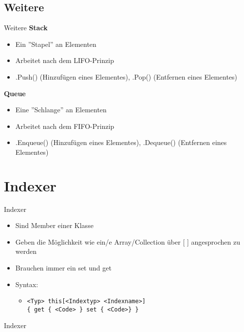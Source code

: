 \subsection{Weitere}
\begin{frame}{Weitere}
	\textbf{Stack}\\
	\begin{itemize}
		\item Ein ''Stapel'' an Elementen
		\item Arbeitet nach dem LIFO-Prinzip
		\item \alert{.Push()} (Hinzufügen eines Elementes), \alert{.Pop()} (Entfernen eines Elementes)
	\end{itemize}
	
	\textbf{Queue}\\
	\begin{itemize}
		\item Eine ''Schlange'' an Elementen
		\item Arbeitet nach dem FIFO-Prinzip
		\item \alert{.Enqueue()} (Hinzufügen eines Elementes), \alert{.Dequeue()} (Entfernen eines Elementes)
	\end{itemize}
	
\end{frame}

\section{Indexer}
\begin{frame}{Indexer}
	\begin{itemize}
		\item Sind Member einer Klasse
		\item Geben die Möglichkeit wie ein/e Array/Collection über \alert{[ ]} angesprochen zu werden
		\item Brauchen immer ein \alert{set} und \alert{get}
		\item Syntax:
		\begin{itemize}
			\item \texttt{\alert{<Typ>} this[\alert{<Indextyp> <Indexname>}]\\ \{ get \{ \alert{<Code>} \} set \{ \alert{<Code>}\} \}}
		\end{itemize}
	\end{itemize}
\end{frame}

\begin{frame}{Indexer}
	
\end{frame}

